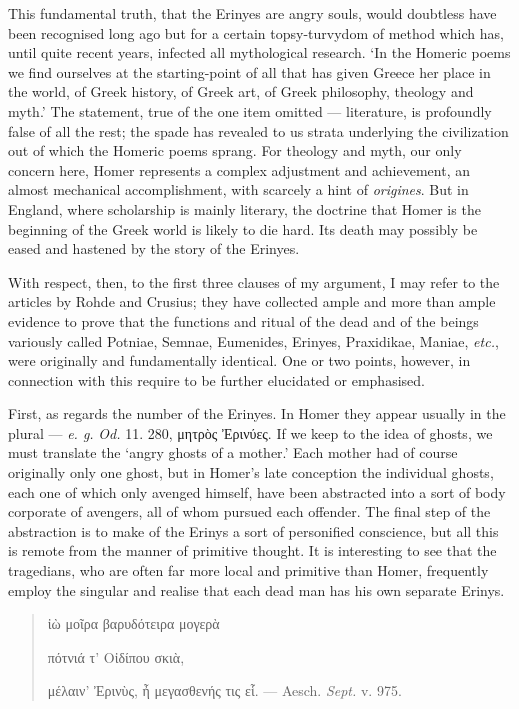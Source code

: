 \documentclass[a4paper, 11pt, oneside, polutonikogreek, english]{article}
\begin{document}
This fundamental truth, that the Erinyes are angry souls, would doubtless have been recognised long ago but for a certain topsy-turvydom of method which has, until quite recent years, infected all mythological research. `In the Homeric poems we find ourselves at the starting-point of all that has given Greece her place in the world, of Greek history, of Greek art, of Greek philosophy, theology and myth.' The statement, true of the one item omitted --- literature, is profoundly false of all the rest; the spade has revealed to us strata underlying the civilization out of which the Homeric poems sprang. For theology and myth, our only concern here, Homer represents a complex adjustment and achievement, an almost mechanical accomplishment, with scarcely a hint of \emph{origines}. But in England, where scholarship is mainly literary, the doctrine that Homer is the beginning of the Greek world is likely to die hard. Its death may possibly be eased and hastened by the story of the Erinyes.

With respect, then, to the first three clauses of my argument, I may refer to the articles by Rohde and Crusius; they have collected ample and more than ample evidence to prove that the functions and ritual of the dead and of the beings variously called Potniae, Semnae, Eumenides, Erinyes, Praxidikae, Maniae, \emph{etc.}, were originally and fundamentally identical. One or two points, however, in connection with this require to be further elucidated or emphasised.

First, as regards the number of the Erinyes. In Homer they appear usually in the plural --- \emph{e. g.} \emph{Od.} 11. 280, μητρὸς Ἐρινύες. If we keep to the idea of ghosts, we must translate the `angry ghosts of a mother.' Each mother had of course originally only one ghost, but in Homer's late conception the individual ghosts, each one of which only avenged himself, have been abstracted into a sort of body corporate of avengers, all of whom pursued each offender. The final step of the abstraction is to make of the Erinys a sort of personified conscience, but all this is remote from the manner of primitive thought. It is interesting to see that the tragedians, who are often far more local and primitive than Homer, frequently employ the singular and realise that each dead man has his own separate Erinys.
\begin{quotation}
ἰὼ μοῖρα βαρυδότειρα μογερὰ

πότνιά τ' Οἰδίπου σκιὰ,

μέλαιν' Ἐρινὺς, ἦ μεγασθενής τις εἷ. --- Aesch. \emph{Sept.} v. 975.
\end{quotation}
\end{document}
